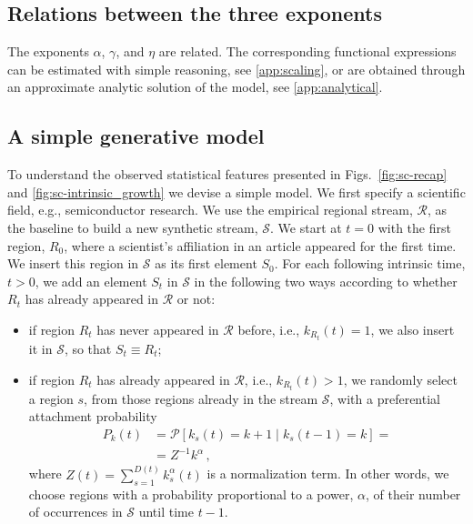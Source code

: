 \documentclass[draft,final]{vutinfth} %
\begin{document}
\subsection{Relations between the three exponents}
The exponents $\alpha$, $\gamma$, and $\eta$ are related. The corresponding functional expressions can be estimated with simple reasoning, see \ref{app:scaling}, or are obtained through an approximate analytic solution of the model, see \ref{app:analytical}.
 
\subsection{A simple generative model}
To understand the observed statistical features presented in Figs.~\ref{fig:sc-recap} and \ref{fig:sc-intrinsic_growth}
we devise a simple model. We first specify a scientific field, e.g., semiconductor research. We use the empirical regional stream, $\mathcal{R}$, as the baseline to build a new synthetic stream, $\mathcal{S}$. We start at $t=0$ with the first region, $R_0$, where a scientist's affiliation in an article appeared for the first time. We insert this region in $\mathcal{S}$ as its first element $S_0$. For each following intrinsic time, $t>0$, we add an element $S_t$ in $\mathcal{S}$ in the following two ways according to whether $R_t$ has already appeared in $\mathcal{R}$ or not: 
\begin{itemize}
\item if region $R_t$ has never appeared in $\mathcal{R}$ before, i.e., $k_{R_t}(t)=1$, we also insert it in $\mathcal{S}$, so that $S_t\equiv R_t$;
\item if region $R_t$ has already appeared in $\mathcal{R}$, i.e., $k_{R_t}(t) > 1$, we randomly select a region $s$, from those regions already in the stream $\mathcal{S}$, with a preferential attachment probability
\begin{equation}
    \begin{array}{rl}
        P_k(t) &= {\mathcal{P}} \left[k_s(t)=k+1 \;|\; k_s(t-1)=k\right] = \\
            &= Z^{-1}{k^\alpha} \, , \nonumber
        \label{eq:kernel}
    \end{array}
\end{equation}
where $Z(t)=\sum_{s=1}^{D(t)} k_s^\alpha(t)$ is a normalization term. In other words, we choose regions with a probability proportional to a power, $\alpha$, of their number of occurrences in $\mathcal S$ until time $t-1$.
\end{itemize}
\end{document}
